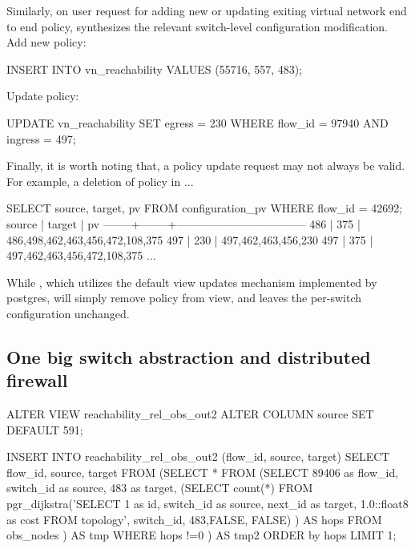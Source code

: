 Similarly, on user request for adding new or updating exiting virtual
network end to end policy, \Sys synthesizes the relevant switch-level
configuration modification.
Add new policy:
\begin{sql}
INSERT INTO vn_reachability VALUES (55716, 557, 483);  
\end{sql}

Update policy:
\begin{sql}
UPDATE vn_reachability SET egress = 230
        WHERE flow_id = 97940 AND ingress = 497;  
\end{sql}

Finally, it is worth noting that, a policy update request may not
always be valid. For example, a deletion of policy  in ... 

\begin{sql}
SELECT source, target, pv FROM configuration_pv WHERE flow_id = 42692;
 source | target |                pv                 
--------+--------+-----------------------------------
    486 |    375 | {486,498,462,463,456,472,108,375}
    497 |    230 | {497,462,463,456,230}
    497 |    375 | {497,462,463,456,472,108,375}
    ...
\end{sql}

While \Sys, which utilizes the default view updates mechanism
implemented by postgres, will simply remove policy  from  view, and leaves the per-switch
configuration unchanged. 

\subsection{One big switch abstraction and distributed firewall}

\begin{sql}
ALTER VIEW reachability_rel_obs_out2 ALTER COLUMN source SET DEFAULT 591;  
\end{sql}



\begin{sql}
INSERT INTO reachability_rel_obs_out2  (flow_id, source, target)
SELECT flow_id, source, target FROM
       (SELECT * FROM
       	       (SELECT 89406 as flow_id,
	       	       switch_id as source,
	       	       483 as target, 
		       (SELECT count(*) FROM
		        pgr_dijkstra('SELECT 1 as id, switch_id as source,
					     next_id as target,
					     1.0::float8 as cost
			              FROM topology', switch_id, 483,FALSE, FALSE)
                       ) AS hops 
                FROM obs_nodes
	       ) AS tmp WHERE hops !=0
       ) AS tmp2 ORDER by hops LIMIT 1;  
\end{sql}
